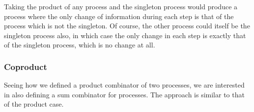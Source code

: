 \documentclass[sigplan,review]{acmart}\settopmatter{printfolios=true,printccs=false,printacmref=false}
\begin{document}
%
Taking the product of any process and the singleton process would produce a process where the only change of information during each step is that of the process which is not the singleton.
%
Of course, the other process could itself be the singleton process also, in which case the only change in each step is exactly that of the singleton process, which is no change at all.
%

\subsubsection{Coproduct}
\label{subsubsec:coproductseqdecproc}

%
Seeing how we defined a product combinator of two processes, we are interested in also defining a sum combinator for processes.
%
The approach is similar to that of the product case.
%
\end{document}
